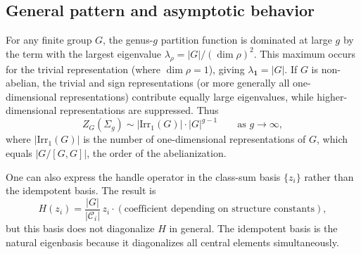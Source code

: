 \subsection{General pattern and asymptotic behavior}

\begin{remark}\label{rem:large-genus}
For any finite group $G$, the genus-$g$ partition function is dominated at large $g$ by the term with the largest eigenvalue $\lambda_\rho = |G|/(\dim\rho)^2$. This maximum occurs for the trivial representation (where $\dim\rho = 1$), giving $\lambda_{\mathbf{1}} = |G|$. If $G$ is non-abelian, the trivial and sign representations (or more generally all one-dimensional representations) contribute equally large eigenvalues, while higher-dimensional representations are suppressed. Thus
\begin{equation}\label{eq:large-genus-asymptotics}
Z_G(\Sigma_g) \sim |\mathrm{Irr}_1(G)| \cdot |G|^{g-1} \qquad \text{as } g \to \infty,
\end{equation}
where $|\mathrm{Irr}_1(G)|$ is the number of one-dimensional representations of $G$, which equals $|G/[G,G]|$, the order of the abelianization.
\end{remark}

\begin{remark}\label{rem:class-sum-handle}
One can also express the handle operator in the class-sum basis $\{z_i\}$ rather than the idempotent basis. The result is
\begin{equation}\label{eq:handle-class-sum}
H(z_i) = \frac{|G|}{|\mathcal{C}_i|}\, z_i \cdot (\text{coefficient depending on structure constants}),
\end{equation}
but this basis does not diagonalize $H$ in general. The idempotent basis is the natural eigenbasis because it diagonalizes all central elements simultaneously.
\end{remark}
